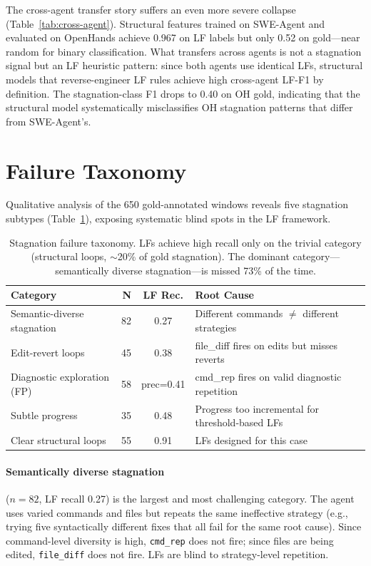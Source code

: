 \documentclass[11pt]{article}
\begin{document}
The cross-agent transfer story suffers an even more severe collapse (Table~\ref{tab:cross-agent}). Structural features trained on SWE-Agent and evaluated on OpenHands achieve 0.967 on LF labels but only 0.52 on gold---near random for binary classification. What transfers across agents is not a stagnation signal but an LF heuristic pattern: since both agents use identical LFs, structural models that reverse-engineer LF rules achieve high cross-agent LF-F1 by definition. The stagnation-class F1 drops to 0.40 on OH gold, indicating that the structural model systematically misclassifies OH stagnation patterns that differ from SWE-Agent's.

\section{Failure Taxonomy}
\label{sec:taxonomy}

Qualitative analysis of the 650 gold-annotated windows reveals five stagnation subtypes (Table~\ref{tab:taxonomy}), exposing systematic blind spots in the LF framework.

\begin{table}[t]
\centering
\small
\begin{tabular}{p{2.5cm}rcp{3.2cm}}
\toprule
\textbf{Category} & \textbf{N} & \textbf{LF Rec.} & \textbf{Root Cause} \\
\midrule
Semantic-diverse stagnation & 82 & 0.27 & Different commands $\neq$ different strategies \\
Edit-revert loops & 45 & 0.38 & file\_diff fires on edits but misses reverts \\
Diagnostic exploration (FP) & 58 & \footnotesize{prec=0.41} & cmd\_rep fires on valid diagnostic repetition \\
Subtle progress & 35 & 0.48 & Progress too incremental for threshold-based LFs \\
Clear structural loops & 55 & 0.91 & LFs designed for this case \\
\bottomrule
\end{tabular}
\caption{Stagnation failure taxonomy. LFs achieve high recall only on the trivial category (structural loops, $\sim$20\% of gold stagnation). The dominant category---semantically diverse stagnation---is missed 73\% of the time.}
\label{tab:taxonomy}
\end{table}

\paragraph{Semantically diverse stagnation} ($n{=}82$, LF recall 0.27) is the largest and most challenging category. The agent uses varied commands and files but repeats the same ineffective strategy (e.g., trying five syntactically different fixes that all fail for the same root cause). Since command-level diversity is high, \texttt{cmd\_rep} does not fire; since files are being edited, \texttt{file\_diff} does not fire. LFs are blind to strategy-level repetition.
\end{document}
